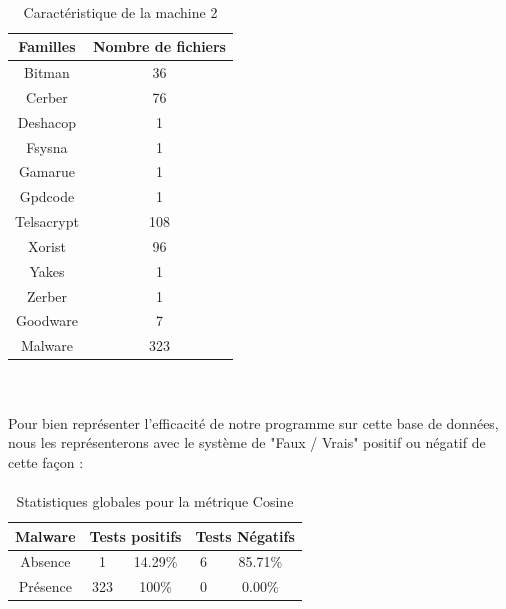 \documentclass[a4paper, 12pt]{book}
\begin{document}
\paragraph{}
\begin{table}[h]
  \centering
\begin{tabular}{|c|c|}
    \hline
    \rowcolor{gray}
   		Familles & Nombre de fichiers\\
    \hline 
       Bitman&36\\
    \hline 
       Cerber&76\\   
    \hline 
       Deshacop & 1\\       
    \hline
       Fsysna & 1\\
    \hline 
      Gamarue & 1\\
    \hline
      Gpdcode & 1\\
    \hline
      Telsacrypt & 108\\
    \hline
      Xorist & 96\\
    \hline
      Yakes & 1\\
    \hline
      Zerber & 1\\
    \hline
    \rowcolor{blue}
      Goodware & 7\\
    \hline
    \rowcolor{orange}
      Malware & 323\\
    \hline
    
\end{tabular}\\
\caption{Caractéristique de la machine 2}
\label{machine2}
\end{table}

\paragraph{}
Pour bien représenter l'efficacité de notre programme sur cette base de données, nous les représenterons avec le système de "Faux / Vrais" positif ou négatif de cette façon :

\paragraph{}
\begin{table}[h]
\centering
\begin{tabular}{|c|c|c|c|c|}
\hline
Malware & \multicolumn{2}{c|}{Tests positifs} & \multicolumn{2}{c|}{Tests Négatifs} \\
\hline
Absence & 1&14.29\% & 6& 85.71\% \\
\hline
Présence & 323 & 100\% & 0 & 0.00\%  \\
\hline
\end{tabular}
\caption{Statistiques globales pour la métrique Cosine}
\end{table}
\end{document}
